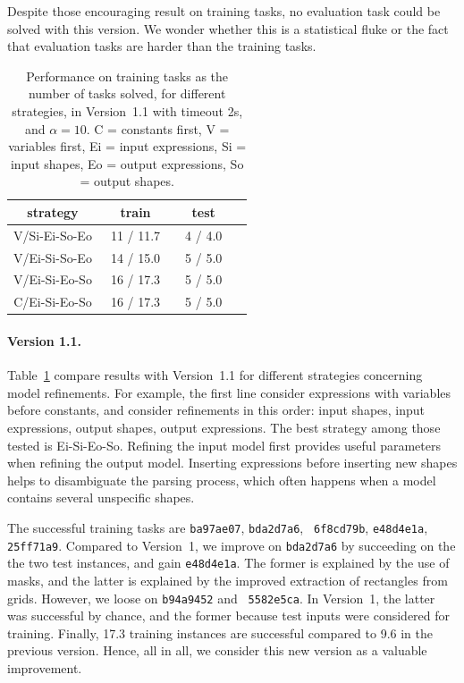 \documentclass[a4paper]{llncs}
\begin{document}
Despite those encouraging result on training tasks, no evaluation task
could be solved with this version. We wonder whether this is a
statistical fluke or the fact that evaluation tasks are harder than
the training tasks.

\begin{table}[t]
  \centering
  \caption{Performance on training tasks as the number of tasks solved, for different strategies, in Version~1.1 with timeout 2s, and $\alpha=10$. C = constants first, V = variables first, Ei = input expressions, Si = input shapes, Eo = output expressions, So = output shapes.}
  \begin{tabular}{|c|c|c|c|}
    \hline
    strategy & train & test \\
    \hline
    V/Si-Ei-So-Eo & ~11 / 11.7~ & ~4 / 4.0~ \\
    V/Ei-Si-So-Eo & ~14 / 15.0~ & ~5 / 5.0~ \\
    V/Ei-Si-Eo-So & ~16 / 17.3~ & ~5 / 5.0~ \\
    C/Ei-Si-Eo-So & ~16 / 17.3~ & ~5 / 5.0~ \\
    \hline
  \end{tabular}
  \label{tab:v11:strategies}
\end{table}

\paragraph{Version 1.1.}  Table~\ref{tab:v11:strategies} compare
results with Version~1.1 for different strategies concerning model
refinements. For example, the first line consider expressions with
variables before constants, and consider refinements in this order:
input shapes, input expressions, output shapes, output expressions.
The best strategy among those tested is Ei-Si-Eo-So. Refining the
input model first provides useful parameters when refining the output
model. Inserting expressions before inserting new shapes helps to
disambiguate the parsing process, which often happens when a model
contains several unspecific shapes.

The successful training tasks are {\tt ba97ae07}, {\tt bda2d7a6}, {\tt
  6f8cd79b}, {\tt e48d4e1a}, {\tt 25ff71a9}. Compared to Version~1, we
improve on {\tt bda2d7a6} by succeeding on the the two test instances,
and gain {\tt e48d4e1a}. The former is explained by the use of masks,
and the latter is explained by the improved extraction of rectangles
from grids.
%
However, we loose on {\tt b94a9452} and {\tt
  5582e5ca}. In Version~1, the latter was successful by chance, and
the former because test inputs were considered for training.
%
Finally, 17.3 training instances are successful compared to 9.6 in the
previous version. Hence, all in all, we consider this new version as a
valuable improvement.
\end{document}
